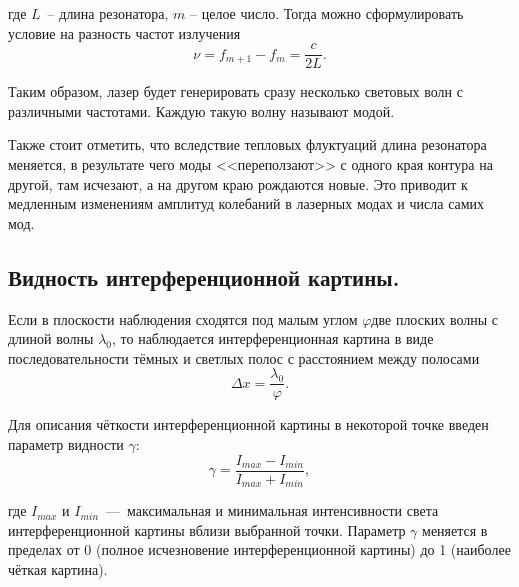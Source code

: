 \documentclass{MagicLabs}
\begin{document}
 где $ L $~– длина резонатора, $ m $ – целое число. Тогда можно сформулировать 
 условие на разность частот излучения
 \begin{equation}\label{kek}
 	\nu = f_{m+1} - f_m = \dfrac{c}{2L}.
 \end{equation}

Таким образом, лазер будет генерировать сразу несколько световых волн с различными
частотами. Каждую такую волну называют модой.

Также стоит отметить, что вследствие тепловых флуктуаций длина резонатора меняется, в результате чего моды <<переползают>> с одного края контура на другой, там исчезают, а на другом краю рождаются новые. Это приводит к медленным изменениям амплитуд колебаний в лазерных модах и числа самих мод.

\subsection*{Видность интерференционной картины.}

Если в плоскости наблюдения сходятся под малым углом $ \varphi $две плоских волны 
с длиной волны $ \lambda_0 $, то наблюдается интерференционная картина в виде
 последовательности тёмных и светлых полос с расстоянием между полосами
 \begin{equation}\label{delta_x}
 	\Delta x = \dfrac{\lambda_0}{\varphi}.
 \end{equation}

Для описания чёткости интерференционной картины в некоторой точке введен
параметр видности $ \gamma $:
\begin{equation}\label{visibility_definition}
	\gamma = \dfrac{I_{max} - I_{min}}{I_{max} + I_{min}},
\end{equation}

где $ I_{max}  $ и $ I_{min} $~---~максимальная и минимальная интенсивности света
интерференционной картины вблизи выбранной точки. Параметр $ \gamma $ 
меняется в пределах от 0 (полное исчезновение интерференционной картины) до 1 (наиболее чёткая картина).
\end{document}
